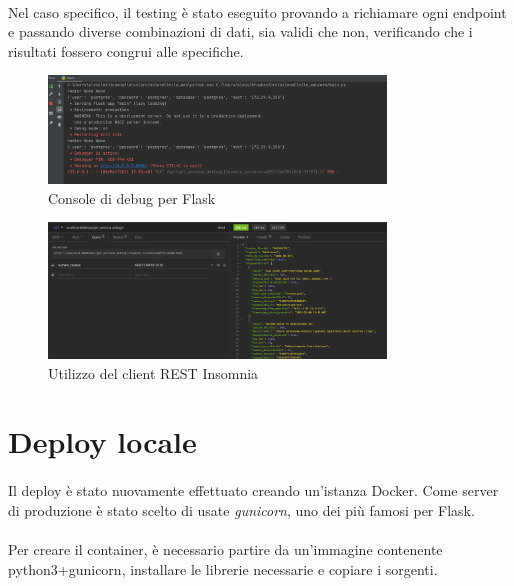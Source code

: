 \documentclass[12pt,a4paper,twoside,english,italian]{book}
\begin{document}
\paragraph{} Nel caso specifico, il testing è stato eseguito provando a richiamare ogni endpoint e passando diverse combinazioni di dati, sia validi che non, verificando che i risultati fossero congrui alle specifiche.


\begin{figure}[H]
    \centering
    \includegraphics[width=0.8\textwidth]{img/api_debug.png}
    \caption{Console di debug per Flask}
\end{figure}


\begin{figure}[H]
    \centering
    \includegraphics[width=0.8\textwidth]{img/insomnia.png}
    \caption{Utilizzo del client REST Insomnia}
\end{figure}



\section{Deploy locale}

\paragraph{} Il deploy è stato nuovamente effettuato creando un'istanza Docker. Come server di produzione è stato scelto di usate \emph{gunicorn}, uno dei più famosi per Flask.

\paragraph{} Per creare il container, è necessario partire da un'immagine contenente python3+gunicorn, installare le librerie necessarie e copiare i sorgenti.
\end{document}
